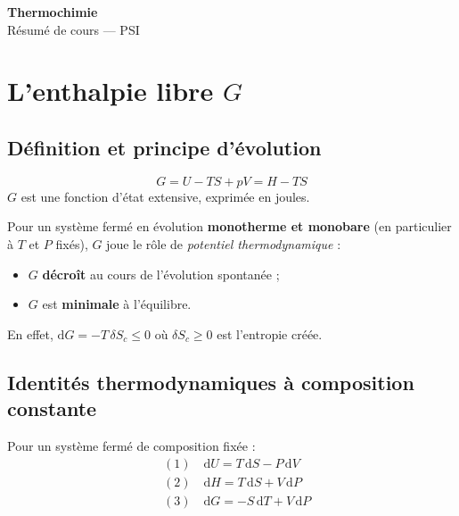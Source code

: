 \documentclass[11pt,a4paper]{article}
\newcommand{\dd}{\mathrm{d}}
\begin{document}
\begin{center}
  {\LARGE\bfseries\color{bleu} Thermochimie}\\[4pt]
  {\large Résumé de cours --- PSI}
\end{center}

\tableofcontents
\vspace{1em}

\section{L'enthalpie libre $G$}

\subsection{Définition et principe d'évolution}

\begin{definition}[title={Enthalpie libre (fonction de Gibbs)}]
\[
  G = U - TS + pV = H - TS
\]
$G$ est une fonction d'état extensive, exprimée en joules.
\end{definition}

\begin{resultat}[title={Principe d'évolution}]
Pour un système fermé en évolution \textbf{monotherme et monobare} (en
particulier à $T$ et $P$ fixés), $G$ joue le rôle de \emph{potentiel
thermodynamique} :
\begin{itemize}[nosep]
  \item $G$ \textbf{décroît} au cours de l'évolution spontanée ;
  \item $G$ est \textbf{minimale} à l'équilibre.
\end{itemize}
En effet, $\dd G = -T\,\delta S_c \le 0$ où $\delta S_c \ge 0$ est l'entropie créée.
\end{resultat}

\subsection{Identités thermodynamiques à composition constante}

Pour un système fermé de composition fixée :
\begin{align*}
  &(1)\quad \dd U = T\,\dd S - P\,\dd V \\
  &(2)\quad \dd H = T\,\dd S + V\,\dd P \\
  &(3)\quad \dd G = -S\,\dd T + V\,\dd P
\end{align*}
\end{document}
